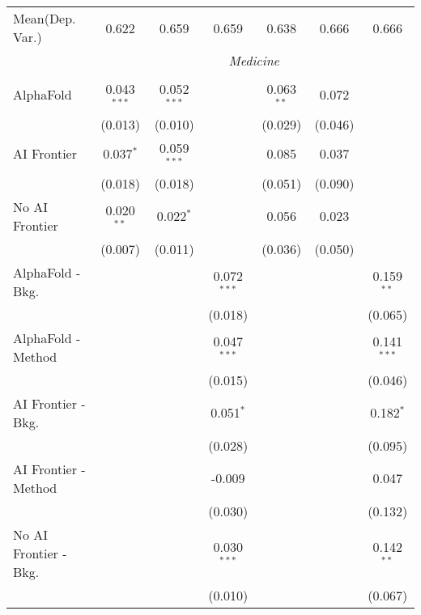 \begin{tabular}{lcccccc}
Mean(Dep. Var.) & 0.622 & 0.659 & 0.659 & 0.638 & 0.666 & 0.666 \\
 & \multicolumn{6}{c}{\textit{Medicine}} \\ \\
   AlphaFold               & 0.043$^{***}$ & 0.052$^{***}$ &               & 0.063$^{**}$ & 0.072   &   \\   
                           & (0.013)       & (0.010)       &               & (0.029)      & (0.046) &   \\   
   AI Frontier             & 0.037$^{*}$   & 0.059$^{***}$ &               & 0.085        & 0.037   &   \\   
                           & (0.018)       & (0.018)       &               & (0.051)      & (0.090) &   \\   
   No AI Frontier          & 0.020$^{**}$  & 0.022$^{*}$   &               & 0.056        & 0.023   &   \\   
                           & (0.007)       & (0.011)       &               & (0.036)      & (0.050) &   \\   
   AlphaFold - Bkg.        &               &               & 0.072$^{***}$ &              &         & 0.159$^{**}$\\   
                           &               &               & (0.018)       &              &         & (0.065)\\   
   AlphaFold - Method      &               &               & 0.047$^{***}$ &              &         & 0.141$^{***}$\\   
                           &               &               & (0.015)       &              &         & (0.046)\\   
   AI Frontier - Bkg.      &               &               & 0.051$^{*}$   &              &         & 0.182$^{*}$\\   
                           &               &               & (0.028)       &              &         & (0.095)\\   
   AI Frontier - Method    &               &               & -0.009        &              &         & 0.047\\   
                           &               &               & (0.030)       &              &         & (0.132)\\   
   No AI Frontier - Bkg.   &               &               & 0.030$^{***}$ &              &         & 0.142$^{**}$\\   
                           &               &               & (0.010)       &              &         & (0.067)\\   

\end{tabular}
